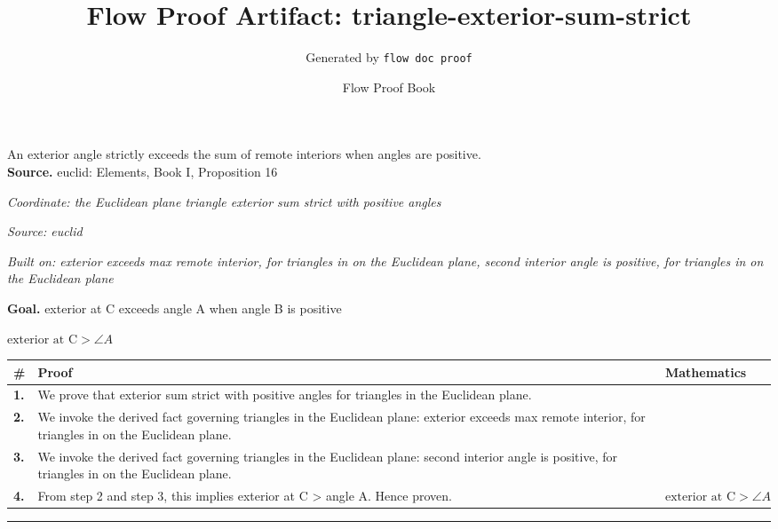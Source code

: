\documentclass[11pt]{article}
\title{Flow Proof Artifact: triangle-exterior-sum-strict}
\author{Generated by \texttt{flow doc proof}}
\date{Flow Proof Book}
\theoremstyle{definition}
\begin{document}
\maketitle
An exterior angle strictly exceeds the sum of remote interiors when angles are positive.\\[0.5em]
\textbf{Source.} euclid: Elements, Book I, Proposition 16\\[0.5em]
\bigskip
{}\par
\smallskip\noindent\textit{Coordinate: the Euclidean plane \cdot triangle \cdot exterior sum strict with positive angles}\par
\smallskip\noindent\textit{Source: euclid}\par
\smallskip\noindent\textit{Built on: exterior exceeds max remote interior, for triangles in on the Euclidean plane, second interior angle is positive, for triangles in on the Euclidean plane}\par
\medskip
\noindent\textbf{Goal.} exterior at C exceeds angle A when angle B is positive\par
\noindent$\displaystyle \text{exterior at C} > \angle A$\par
\medskip
\noindent
\begin{tabular}{@{} >{\raggedright\arraybackslash}p{} >{\raggedright\arraybackslash}p{} >{\raggedleft\arraybackslash}p{} @{}}
\textbf{\#} & \textbf{Proof} & \textbf{Mathematics} \\
\midrule
\textbf{1.} & We prove that exterior sum strict with positive angles for triangles in the Euclidean plane. & \\[0.45em]
\textbf{2.} & We invoke the derived fact governing triangles in the Euclidean plane: exterior exceeds max remote interior, for triangles in on the Euclidean plane. & \\[0.45em]
\textbf{3.} & We invoke the derived fact governing triangles in the Euclidean plane: second interior angle is positive, for triangles in on the Euclidean plane. & \\[0.45em]
\textbf{4.} & From step 2 and step 3, this implies exterior at C > angle A. Hence proven. & $\displaystyle \text{exterior at C} > \angle A$ \\[0.45em]
\bottomrule
\end{tabular}
\label{thm:Geometry-triangle-exterior_sum_strict_with_positive_angles}
\par\medskip\hrule
\end{document}
